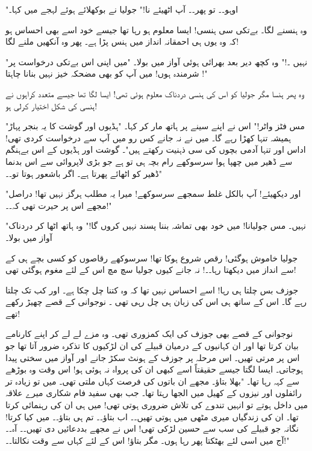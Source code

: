 "اوہو۔۔ تو پھر۔۔ آپ اٹھیئے نا!" جولیا نے بوکھلائے ہوئے لہجے میں کہا۔

وہ ہنسنے لگا۔ بےتکی سی ہنسی! ایسا معلوم ہو رہا تھا جیسے خود اسے بھی احساس ہو کہ وہ یوں ہی احمقانہ انداز میں ہنس پڑا ہے۔ پھر وہ آنکھیں ملنے لگا!

"نہیں ۔!" وہ کچھ دیر بعد بھرائی ہوئی آواز میں بولا۔ "میں اپنی اس بےتکی درخواست پر شرمندہ ہوں! میں آپ کو بھی مضحکہ خیز نہیں بنانا چاہتا !"

وہ پھر ہنسا مگر جولیا کو اس کی ہنسی دردناک معلوم ہوئی تھی! ایسا لگا تھا جیسے متعدد کراہوں نے ہنسی کی شکل اختیار کرلی ہو!

"مس فٹز واٹر!" اس نے اپنے سینے پر ہاتھ مار کر کہا۔ "ہڈیوں اور گوشت کا یہ بنجر پہاڑ ہمیشہ تنہا کھڑا رہے گا۔ میں نے نہ جانے کس رو میں آپ سے درخواست کردی تھی! اداس اور تنہا آدمی بچوں کی سی ذہنیت رکھتے ہیں"۔ گوشت اور ہڈیوں کے اس بےہنگم سے ڈھیر میں چھپا ہوا سرسوکھے رام بچہ ہی تو ہے جو بڑی لاپروائی سے اس بدنما ڈھیر کو اٹھائے پھرتا ہے۔ اگر باشعور ہوتا تو۔۔"

"اور دیکھیئے! آپ بالکل غلط سمجھے سرسوکھے! میرا یہ مطلب ہرگز نہیں تھا! دراصل مجھے اس پر حیرت تھی کہ۔۔!"

"نہیں۔ مس جولیانا! میں خود بھی تماشہ بننا پسند نہیں کروں گا!" وہ ہاتھ اٹھا کر دردناک آواز میں بولا۔

جولیا خاموش ہوگئی! رقص شروع ہوکا تھا! سرسوکھے رقاصوں کو کسی بچے ہی کے سے انداز میں دیکھتا رہا۔۔! نہ جانے کیوں جولیا سچ مچ اس کے لئے مغوم ہوگئی تھی!

\endR

\bigskip\bigskip\bigskip
\centerline{}
\bigskip\bigskip\bigskip
\beginR
\body


جوزف بس چلتا ہی رہا! اسے احساس نہیں تھا کہ وہ کتنا چل چکا ہے۔ اور کب تک چلتا رہے گا۔ اس کے ساتھ ہی اس کی زبان ہی چل رہی تھی ۔ نوجوانی کے قصے چھیڑ رکھے تھے!

نوجوانی کے قصے بھی جوزف کی ایک کمزوری تھی۔ وہ مزے لے لے کر اپنے کارنامے بیان کرتا تھا اور ان کہانیوں کے درمیان قبیلے کی ان لڑکیوں کا تذکرہ ضرور آتا تھا جو اس پر مرتی تھیں۔ اس مرحلہ پر جوزف کے ہونٹ سکڑ جانے اور آواز میں سختی پیدا ہوجاتی۔ ایسا لگتا جیسے حقیقتاً اسے کبھی ان کی پرواہ نہ ہوئی ہو! اس وقت وہ بوڑھے سے کہہ رہا تھا۔ "بھلا بتاؤ۔ مجھے ان باتوں کی فرصت کہاں ملتی تھی۔ میں تو زیادہ تر رائفلوں اور نیزوں کے کھیل میں الجھا رہتا تھا۔ جب بھی سفید فام شکاری میرے علاقہ میں داخل ہوتے تو انہیں تندوے کی تلاش ضروری ہوتی تھی! میں ہی ان کی رہنمائی کرتا تھا۔ ان کی زندگیاں میری مٹھی میں ہوتی تھیں۔۔ اب بتاؤ۔۔ تم ہی بتاؤ۔۔ میں کیا کرتا! نگانہ جو قبیلے کی سب سے حسین لڑکی تھی! اس نے مجھے بددعائیں دی تھیں۔۔ آہ۔۔ آج میں اسی لئے بھٹکتا پھر رہا ہوں۔ مگر بتاؤ! اس کے لئے کہاں سے وقت نکالتا۔۔!"

